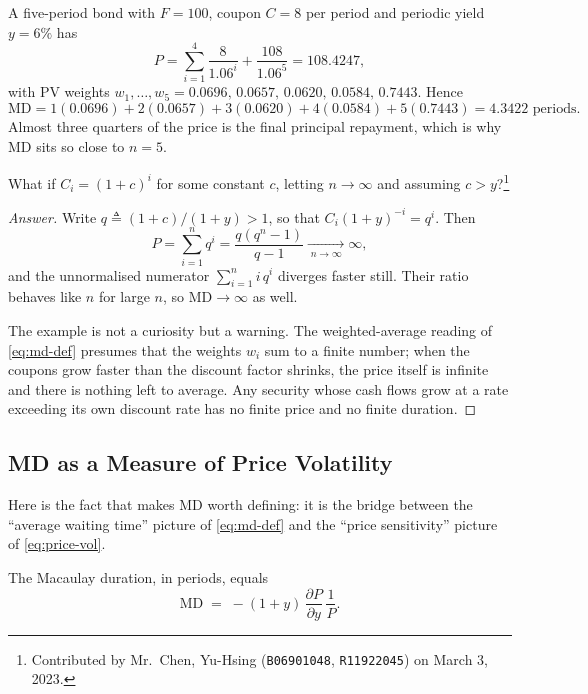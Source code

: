 \begin{eg}
	A five-period bond with $F=100$, coupon $C=8$ per period and periodic yield $y=6\%$ has
	\[
		P = \sum_{i=1}^{4}\frac{8}{1.06^{i}} + \frac{108}{1.06^{5}} = 108.4247 ,
	\]
	with PV weights $w_{1},\dots,w_{5} = 0.0696,\,0.0657,\,0.0620,\,0.0584,\,0.7443$.
	Hence
	\[
		\mathrm{MD} = 1(0.0696)+2(0.0657)+3(0.0620)+4(0.0584)+5(0.7443) = 4.3422 \text{ periods} .
	\]
	Almost three quarters of the price is the final principal repayment, which is why MD sits so close to $n=5$.
\end{eg}
\suppend

\begin{question}
	What if $C_{i}=(1+c)^{i}$ for some constant $c$, letting $n\to\infty$ and assuming $c>y$?\footnote{Contributed by Mr.~Chen, Yu-Hsing (\texttt{B06901048}, \texttt{R11922045}) on March 3, 2023.}
\end{question}

\suppstart
\begin{proof}[Answer]
	Write $q \triangleq (1+c)/(1+y) > 1$, so that $C_{i}(1+y)^{-i} = q^{i}$.
	Then
	\[
		P = \sum_{i=1}^{n} q^{i} = \frac{q(q^{n}-1)}{q-1} \xrightarrow[\;n\to\infty\;]{} \infty ,
	\]
	and the unnormalised numerator $\sum_{i=1}^{n} i\,q^{i}$ diverges faster still.
	Their ratio behaves like $n$ for large $n$, so $\mathrm{MD}\to\infty$ as well.

	The example is not a curiosity but a warning.
	The weighted-average reading of \eqref{eq:md-def} presumes that the weights $w_{i}$ sum to a finite number; when the coupons grow faster than the discount factor shrinks, the price itself is infinite and there is nothing left to average.
	Any security whose cash flows grow at a rate exceeding its own discount rate has no finite price and no finite duration.
\end{proof}
\suppend

\subsection{MD as a Measure of Price Volatility}
\label{sec:md-volatility}


Here is the fact that makes MD worth defining: it is the bridge between the ``average waiting time'' picture of \eqref{eq:md-def} and the ``price sensitivity'' picture of \eqref{eq:price-vol}.

\begin{theorem}
	The Macaulay duration, in periods, equals
	\begin{equation}
		\mathrm{MD} \;=\; -(1+y)\,\frac{\partial P}{\partial y}\,\frac{1}{P}. \label{eq:md-vol}
	\end{equation}
\end{theorem}

